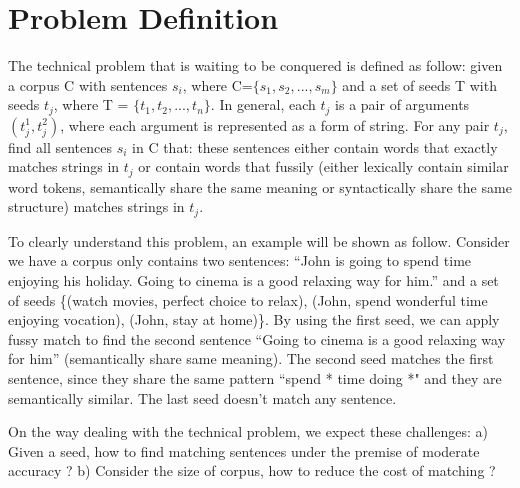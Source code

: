 \section{Problem Definition}
\label{sec:problem}
   The technical problem that is waiting to be conquered is defined as follow: given a corpus C with sentences $s_i$, where C=$\{s_1,s_2,...,s_m\}$ and a set of seeds T with seeds $t_j$, where T = $\{t_{1},t_{2},...,t_n\}$.  In general, each $t_j$ is a pair of arguments$(t_j^1,t_j^2)$, where each argument is represented as a form of string. For any pair $t_j$, find all sentences $s_i$ in C that: these sentences either contain words that exactly matches strings in $t_j$ or contain words that fussily (either lexically contain similar word tokens, semantically share the same meaning or syntactically share the same structure) matches strings in $t_j$. 
   
 
To clearly understand this problem, an example will be shown as follow. Consider we have a corpus only contains two sentences: ``John is going to spend time enjoying his holiday. Going to cinema is a good relaxing way for him.'' and a set of seeds \{(watch movies, perfect choice to relax),  (John, spend wonderful time enjoying vocation), (John, stay at home)\}. By using the first seed, we can apply fussy match to find the second sentence ``Going to cinema is a good relaxing way for him'' (semantically share same meaning). The second seed matches the first sentence, since they share the same pattern ``spend * time doing *" and they are semantically similar. The last seed doesn't match any sentence. 
 
 On the way dealing with the technical problem, we expect these challenges: a) Given a seed, how to find matching sentences under the premise of moderate accuracy ? b) Consider the size of corpus, how to reduce the cost of matching ? 